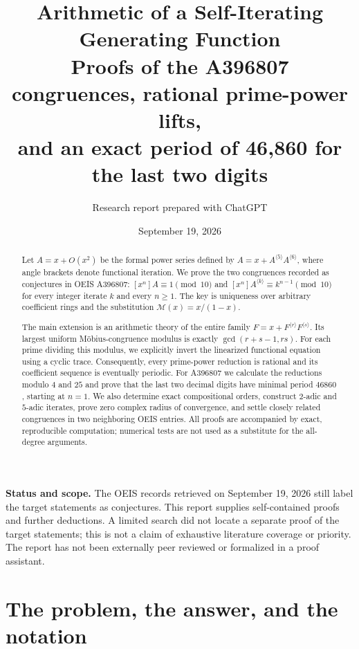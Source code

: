 \documentclass[11pt,letterpaper]{article}
\title{\vspace{-1.0cm}\color{DeepBlue}\bfseries
 Arithmetic of a Self-Iterating\\[3pt] Generating Function\\[7pt]
 \large Proofs of the A396807 congruences, rational prime-power lifts,\\
 and an exact period of 46,860 for the last two digits}
\author{\normalsize Research report prepared with ChatGPT}
\date{September 19, 2026}
\theoremstyle{definition}
\theoremstyle{remark}
\newcommand{\iter}[2]{#1^{\langle #2\rangle}}
\newcommand{\coeff}[1]{[x^{#1}]}
\newcommand{\M}{\mathcal M}
\begin{document}
\maketitle
\thispagestyle{fancy}

\begin{abstract}
Let $A=x+O(x^2)$ be the formal power series defined by
$A=x+\iter{A}{5}\iter{A}{6}$, where angle brackets denote functional
iteration.  We prove the two congruences recorded as conjectures in OEIS
A396807: $\coeff{n}A\equiv1\pmod {10}$ and
$\coeff{n}\iter{A}{k}\equiv k^{n-1}\pmod {10}$ for every integer iterate
$k$ and every $n\geq1$.  The key is uniqueness over arbitrary coefficient
rings and the substitution $\M(x)=x/(1-x)$.

The main extension is an arithmetic theory of the entire family
$F=x+\iter{F}{r}\iter{F}{s}$.  Its largest uniform M\"obius-congruence
modulus is exactly $\gcd(r+s-1,rs)$.  For each prime dividing this modulus,
we explicitly invert the linearized functional equation using a cyclic
trace.  Consequently, every prime-power reduction is rational and its
coefficient sequence is eventually periodic.  For A396807 we calculate
the reductions modulo $4$ and $25$ and prove that the last two decimal
digits have minimal period $46860$, starting at $n=1$.  We also determine
exact compositional orders, construct $2$-adic and $5$-adic iterates,
prove zero complex radius of convergence, and settle closely related
congruences in two neighboring OEIS entries.  All proofs are accompanied
by exact, reproducible computation; numerical tests are not used as a
substitute for the all-degree arguments.
\end{abstract}

\begin{tcolorbox}[colback=PaleBlue,colframe=DeepBlue,boxrule=0.5pt,
 arc=1pt,left=8pt,right=8pt,top=6pt,bottom=6pt]
\textbf{Status and scope.}
The OEIS records retrieved on September 19, 2026 still label the target
statements as conjectures.  This report supplies self-contained proofs
and further deductions.  A limited search did not locate a separate
proof of the target statements; this is not a claim of exhaustive
literature coverage or priority.  The report has not been externally
peer reviewed or formalized in a proof assistant.
\end{tcolorbox}

\clearpage
\tableofcontents
\newpage

\section{The problem, the answer, and the notation}\label{sec:problem}
\end{document}
